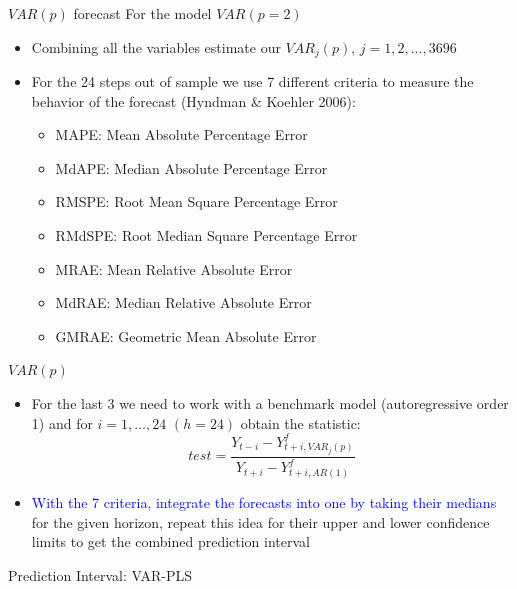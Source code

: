 \documentclass{beamer}
\newcommand{\?}{?`}
\begin{document}
\begin{frame}{$VAR(p)$ forecast}
  For the model $VAR(p=2)$
  \begin{itemize}
  \item Combining all the variables estimate our
    $VAR_j(p)$, $j=1,2,\ldots,3696$
  \item For the 24 steps out of sample we use 7 different criteria to measure the behavior of the forecast (Hyndman \& Koehler 2006):
  \begin{itemize}
    \item MAPE: Mean Absolute Percentage Error
    \item MdAPE: Median Absolute Percentage Error
    \item RMSPE: Root Mean Square Percentage Error
    \item RMdSPE: Root Median Square Percentage Error
    \item MRAE: Mean Relative Absolute Error
    \item MdRAE: Median Relative Absolute Error
    \item GMRAE: Geometric Mean Absolute Error
    \end{itemize}
  \end{itemize}
\end{frame}

\begin{frame}{$VAR(p)$}
  \begin{itemize}
  \item For the last 3 we need to work with a benchmark model (autoregressive order 1) and for $i=1,\ldots,24$ $(h = 24)$ obtain the statistic:
      \begin{displaymath}
      test=\frac{Y_{t-i}-Y_{t+i,VAR_j(p)}^f}{Y_{t+i}-Y_{t+i,AR(1)}^f}
    \end{displaymath}
  \item \textcolor{blue}{With the 7 criteria, integrate the forecasts into one by taking their medians} for the given horizon, repeat this idea
  for their upper and lower confidence limits  to get the combined prediction interval
  \end{itemize}
\end{frame}

\begin{frame}{}
  \begin{block}{}
    \begin{center}
      \vspace{3mm}
      {\Large Prediction Interval: VAR-PLS}
      \vspace{3mm}
    \end{center}
  \end{block}
\end{frame}
\end{document}
